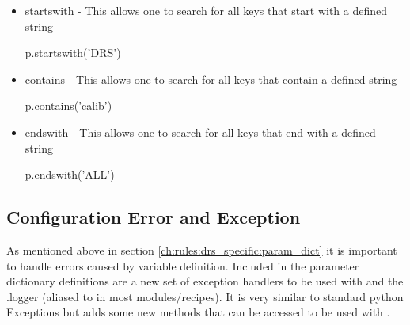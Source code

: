 \begin{itemize}
	\item startswith - This allows one to search for all keys that start with a defined string

	\begin{pythonbox}
	p.startswith('DRS')
	\end{pythonbox}
	\begin{cmdboxprint}
	 \end{cmdboxprint}


	\item contains - This allows one to search for all keys that contain a defined string
	\begin{pythonbox}
	p.contains('calib')
	\end{pythonbox}
	\begin{cmdboxprint}
	 \end{cmdboxprint}

	\item endswith - This allows one to search for all keys that end with a defined string
	\begin{pythonbox}
	p.endswith('ALL')
	\end{pythonbox}
	\begin{cmdboxprint}
	 \end{cmdboxprint}

\end{itemize}


\clearpage
\newpage
\subsection{Configuration Error and Exception}
\label{ch:rules:drs_specific:config_error}

As mentioned above in section \ref{ch:rules:drs_specific:param_dict} it is important to handle errors caused by variable definition. Included in the parameter dictionary definitions are a new set of exception handlers to be used with \ParamDict and the \spirouLog.logger (aliased to \WLOG in most modules/recipes). It is very similar to standard python Exceptions but adds some new methods that can be accessed to be used with \WLOG. \\

